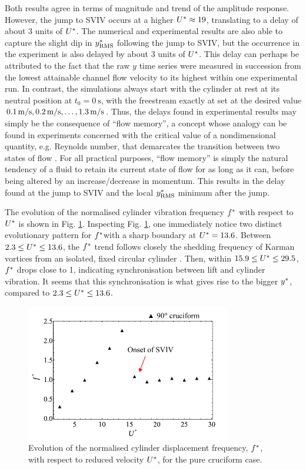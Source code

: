 \documentclass[oneside]{utmthesis}
\begin{document}
\noindent Both results agree in terms of magnitude and trend of the amplitude response. However, the jump to SVIV occurs at a higher $U^{*} \approx 19$, translating to a delay of about 3 units of $U^{*}$. The numerical and experimental results are also able to capture the slight dip in $y^{*}_{\text{RMS}}$ following the jump to SVIV, but the occurrence in the experiment is also delayed by about 3 units of $U^{*}$. This delay can perhaps be attributed to the fact that the raw $y$ time series were measured in succession from the lowest attainable channel flow velocity \uth{} to its highest \uel{} within one experimental run. In contrast, the simulations always start with the cylinder at rest at its neutral position at $t_{0} = \SI{0}{\second}$, with the freestream exactly at set at the desired value $\uon, \utw, \dots, \utt$. Thus, the delays found in experimental results may simply be the consequence of ``flow memory'', a concept whose analogy can be found in experiments concerned with the critical value of a nondimensional quantity, e.g. Reynolds number, that demarcates the transition between two states of flow \citep{Saint-Michel2014,Rahman2015,Li2021}. For all practical purposes, ``flow memory'' is simply the natural tendency of a fluid to retain its current state of flow for as long as it can, before being altered by an increase/decrease in momentum. This results in the delay found at the jump to SVIV and the local $y^{*}_{\text{RMS}}$ minimum after the jump.

The evolution of the normalised cylinder vibration frequency $f^{*}$ with respect to $U^{*}$ is shown in Fig. \ref{fig:yStrFreq5}. Inspecting Fig. \ref{fig:yStrFreq5}, one immediately notice two distinct evolutionary pattern for $f^{*}$with a sharp boundary at $U^{*} = 13.6$. Between $2.3 \leq U^{*} \leq 13.6$, the $f^{*}$ trend follows closely the shedding frequency of Karman vortices from an isolated, fixed circular cylinder \citep{Blevins1990}. Then, within $15.9 \leq U^{*} \leq 29.5$, $f^{*}$ drops close to 1, indicating synchronisation between lift and cylinder vibration. It seems that this synchronisation is what gives rise to the bigger $y^{*}$, compared to $2.3 \leq U^{*} \leq 13.6$.

\begin{figure}[H]
  \centering
  \includegraphics[width=0.8\textwidth]{figs/yStrFreq5}
  \caption{Evolution of the normalised cylinder displacement frequency, $f^{*}$, with respect to reduced velocity $U^{*}$, for the pure cruciform case.}
  \label{fig:yStrFreq5}
\end{figure}
\end{document}
